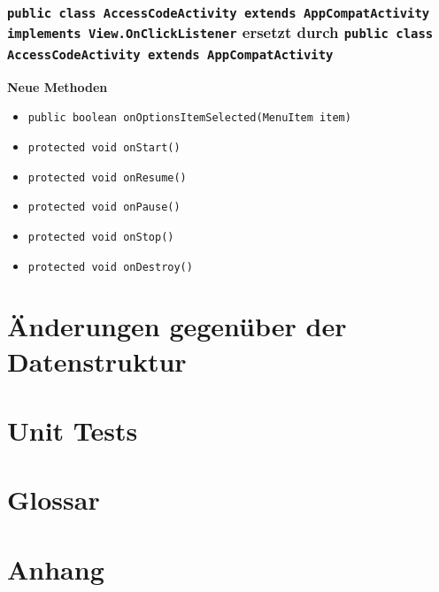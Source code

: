 \documentclass[a4paper]{scrreprt}
\begin{document}
		\subsection{\texttt{public class AccessCodeActivity extends AppCompatActivity implements View.OnClickListener} ersetzt durch \texttt{public class AccessCodeActivity extends AppCompatActivity}}
		\textbf{Neue Methoden}
		\begin{itemize}
			\item \texttt{public boolean onOptionsItemSelected(MenuItem item)}
			\item \texttt{protected void onStart()}
			\item \texttt{protected void onResume()}
			\item \texttt{protected void onPause()}
			\item \texttt{protected void onStop()}
			\item \texttt{protected void onDestroy()}
		\end{itemize}
		
		\chapter{Änderungen gegenüber der Datenstruktur}
		
		\chapter{Unit Tests}
		
		
		\chapter{Glossar}
		
		\chapter{Anhang}
\end{document}
